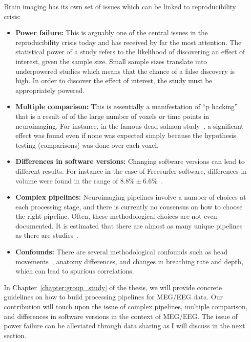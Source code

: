 Brain imaging has its own set of issues which can be linked to reproducibility crisis: 


\begin{itemize}[noitemsep,partopsep=0pt]
\item \textbf{Power failure:} This is arguably one of the central issues in the reproducibility crisis today and has received by far the most attention. The statistical power of a study refers to the likelihood of discovering an effect of interest, given the sample size. Small sample sizes translate into underpowered studies which means that the chance of a false discovery is high. In order to discover the effect of interest, the study must be appropriately powered.
\item \textbf{Multiple comparison:} This is essentially a manifestation of ``p hacking'' that is a result of of the large number of voxels or time points in neuroimaging. For instance, in the famous dead salmon study~\citep{bennett2009neural}, a significant effect was found even if none was expected simply because the hypothesis testing (comparisons) was done over each voxel.
\item \textbf{Differences in software versions:} Changing software versions can lead to different results. For instance in the case of Freesurfer software, differences in volume were found in the range of $8.8\% \pm 6.6\%$~\citep{gronenschild2012effects}.
\item \textbf{Complex pipelines:} Neuroimaging pipelines involve a number of choices at each processing stage, and there is currently no consensus on how to choose the right pipeline. Often, these methodological choices are not even documented. It is estimated that there are almost as many unique pipelines as there are studies~\citep{Carp2012289}.
\item \textbf{Confounds:} There are several methodological confounds such as head movements~\citep{yendiki2014spurious}, anatomy differences, and changes in breathing rate and depth, which can lead to spurious correlations.
\end{itemize}

In Chapter~\ref{chapter:group_study} of the thesis, we will provide concrete guidelines on how to build processing pipelines for \ac{MEG}/\ac{EEG} data. Our contribution will touch upon the issue of complex pipelines, multiple comparison, and differences in software versions in the context of \ac{MEG}/\ac{EEG}. The issue of power failure can be alleviated through data sharing as I will discuss in the next section.

